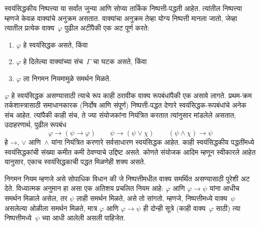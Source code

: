 \documentclass[11pt,a4paper,openany]{book}
\theoremstyle{definition}
\newcommand{\lif}{\mathbin{\to}}
\begin{document}
स्वयंसिद्धकीय निष्पत्त्या या सर्वांत जुन्या आणि सोप्या तार्किक
निष्पत्ती-पद्धती आहेत. त्यांतील निष्पत्त्या म्हणजे केवळ
वाक्यांचे अनुक्रम असतात. वाक्यांचा अनुक्रम तेव्हा योग्य
निष्पत्ती मानला जातो, जेव्हा त्यातील प्रत्येक वाक्य~$\varphi$ पुढील
अटींपैकी एक अट पूर्ण करते:
\begin{enumerate}
\item $\varphi$ हे स्वयंसिद्धक असते, किंवा
\item $\varphi$ हे दिलेल्या वाक्यांच्या संच~$\Gamma$ चा घटक असते, किंवा
\item $\varphi$ ला निगमन नियमामुळे समर्थन मिळते.
\end{enumerate}
$\varphi$ हे स्वयंसिद्धक असण्यासाठी त्याचे रूप काही ठरावीक वाक्य
रूपबंधांपैकी एक असावे लागते. प्रथम-क्रम तर्कशास्त्रासाठी समाधानकारक
(निर्दोष आणि संपूर्ण) निष्पत्ती-पद्धत देणारे स्वयंसिद्धक-रूपबंधांचे
अनेक संच आहेत. त्यांपैकी काही संच, ते ज्या संयोजकांना नियंत्रित करतात
त्यांनुसार मांडलेले असतात; उदाहरणार्थ, पुढील रूपबंध
\[
\varphi \lif (\psi \lif \varphi) \qquad \psi \lif (\psi \lor \chi) \qquad (\psi \land \chi) \lif \psi
\]
हे $\lif$, $\lor$ आणि~$\land$ यांना नियंत्रित करणारे सर्वसाधारण स्वयंसिद्धक
आहेत. काही स्वयंसिद्धकीय पद्धतींमध्ये स्वयंसिद्धकांची संख्या कमीत कमी
ठेवण्याचे उद्दिष्ट असते. कोणते संयोजक आदिम म्हणून स्वीकारले आहेत यानुसार,
एकाच स्वयंसिद्धकाची पद्धत मिळणेही शक्य असते.

निगमन नियम म्हणजे असे सोपाधिक विधान की जे निष्पत्तीमधील
वाक्य समर्थित असण्यासाठी पुरेशी अट देते. विध्यात्मक अनुमान हा असा
एक अतिशय प्रचलित नियम आहे: $\varphi$ आणि $\varphi \lif \psi$ यांना आधीच समर्थन मिळाले
असेल, तर $\psi$ लाही समर्थन मिळते, असे तो सांगतो. म्हणजे, निष्पत्तीमध्ये वाक्य~$\psi$ असलेल्या ओळीला समर्थन मिळते, मात्र $\varphi$ आणि
$\varphi \lif \psi$ ही दोन्ही सूत्रे (काही वाक्य~$\varphi$ साठी) त्या
निष्पत्तीमध्ये~$\psi$ च्या आधी आलेली असली पाहिजेत.
\end{document}
